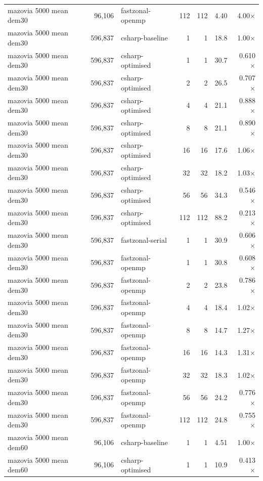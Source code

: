 \begin{tabular}{lrlrrrr}
mazovia 5000 mean dem30 & 96,106 & fastzonal-openmp & 112 & 112 & 4.40 & 4.00$\times$ \\
mazovia 5000 mean dem30 & 596,837 & csharp-baseline & 1 & 1 & 18.8 & 1.00$\times$ \\
mazovia 5000 mean dem30 & 596,837 & csharp-optimised & 1 & 1 & 30.7 & 0.610$\times$ \\
mazovia 5000 mean dem30 & 596,837 & csharp-optimised & 2 & 2 & 26.5 & 0.707$\times$ \\
mazovia 5000 mean dem30 & 596,837 & csharp-optimised & 4 & 4 & 21.1 & 0.888$\times$ \\
mazovia 5000 mean dem30 & 596,837 & csharp-optimised & 8 & 8 & 21.1 & 0.890$\times$ \\
mazovia 5000 mean dem30 & 596,837 & csharp-optimised & 16 & 16 & 17.6 & 1.06$\times$ \\
mazovia 5000 mean dem30 & 596,837 & csharp-optimised & 32 & 32 & 18.2 & 1.03$\times$ \\
mazovia 5000 mean dem30 & 596,837 & csharp-optimised & 56 & 56 & 34.3 & 0.546$\times$ \\
mazovia 5000 mean dem30 & 596,837 & csharp-optimised & 112 & 112 & 88.2 & 0.213$\times$ \\
mazovia 5000 mean dem30 & 596,837 & fastzonal-serial & 1 & 1 & 30.9 & 0.606$\times$ \\
mazovia 5000 mean dem30 & 596,837 & fastzonal-openmp & 1 & 1 & 30.8 & 0.608$\times$ \\
mazovia 5000 mean dem30 & 596,837 & fastzonal-openmp & 2 & 2 & 23.8 & 0.786$\times$ \\
mazovia 5000 mean dem30 & 596,837 & fastzonal-openmp & 4 & 4 & 18.4 & 1.02$\times$ \\
mazovia 5000 mean dem30 & 596,837 & fastzonal-openmp & 8 & 8 & 14.7 & 1.27$\times$ \\
mazovia 5000 mean dem30 & 596,837 & fastzonal-openmp & 16 & 16 & 14.3 & 1.31$\times$ \\
mazovia 5000 mean dem30 & 596,837 & fastzonal-openmp & 32 & 32 & 18.3 & 1.02$\times$ \\
mazovia 5000 mean dem30 & 596,837 & fastzonal-openmp & 56 & 56 & 24.2 & 0.776$\times$ \\
mazovia 5000 mean dem30 & 596,837 & fastzonal-openmp & 112 & 112 & 24.8 & 0.755$\times$ \\
mazovia 5000 mean dem60 & 96,106 & csharp-baseline & 1 & 1 & 4.51 & 1.00$\times$ \\
mazovia 5000 mean dem60 & 96,106 & csharp-optimised & 1 & 1 & 10.9 & 0.413$\times$ \\

\end{tabular}
